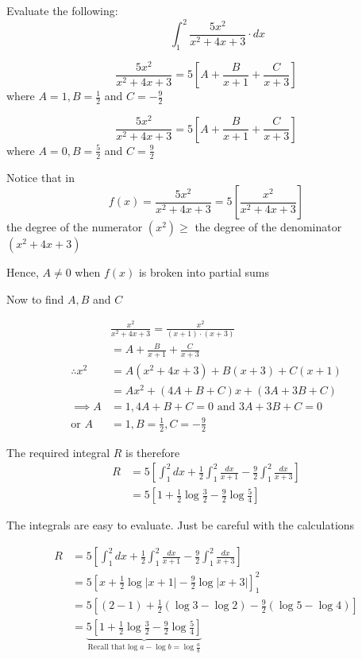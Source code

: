 \documentclass[14pt,fleqn]{extarticle}
\begin{document}
Evaluate the following: 
\[ \qquad \int_1^2\frac{5x^2}{x^2+4x+3}\cdot dx \]
%


\newcard 

\[ \frac{5x^2}{x^2 + 4x + 3} = 5 \left[A + \frac{B}{x+1} + \frac{C}{x+3} \right]\]
where $A = 1, B = \frac{1}{2}$ and $C = -\frac{9}{2}$ 

\newcard 

\[ \frac{5x^2}{x^2 + 4x + 3} = 5 \left[A + \frac{B}{x+1} + \frac{C}{x+3} \right]\]
where $A = 0, B = \frac{5}{2}$ and $C = \frac{9}{2}$

\newcard 

Notice that in  \[f(x) = \frac{5x^2}{x^2 + 4x + 3} = 5 \left[\frac{x^2}{x^2+4x+3} \right]\] the degree of the numerator $(x^2) \geq $ the degree of the denominator $(x^2+4x+3)$ \newline 

Hence, $A\neq 0$ when $f(x)$ is broken into partial sums\newline 

Now to find $A,B$ and $C$ 

\smallmath
\begin{align}
	&\frac{x^2}{x^2 + 4x+3} = \frac{x^2}{\left(x+1 \right)\cdot \left(x+3 \right)} \\
	& = A + \frac{B}{x+1} + \frac{C}{x+3}  \\
	\therefore x^2 &= A (x^2+4x+3) + B(x+3) + C(x+1) \\
	&= Ax^2 + \left(4A+B+C \right) x + \left(3A+3B+C \right) \\
	\implies A &= 1, 4A+B+C = 0\text{ and } 3A+3B+ C = 0 \\
	\text{or } A &= 1, B = \frac{1}{2}, C = -\frac{9}{2}
\end{align}

\newcard 

The required integral $R$ is therefore 
\begin{align}
	R &= 5 \left[ \int_1^2 dx + \frac{1}{2}\int_1^2 \frac{dx}{x+1} - \frac{9}{2}\int_1^2 \frac{dx}{x+3} \right] \\
	&= 5 \left[1+\frac{1}{2}\log\frac{3}{2} - \frac{9}{2}\log\frac{5}{4} \right]
\end{align}

\newcard 
\smallmath

The integrals are easy to evaluate. Just be careful with the calculations 

\begin{align}
	R &=  5 \left[ \int_1^2 dx + \frac{1}{2}\int_1^2 \frac{dx}{x+1} - \frac{9}{2}\int_1^2 \frac{dx}{x+3} \right] \\
	&= 5 \left[ x + \frac{1}{2}\log\vert x+1\vert -\frac{9}{2}\log \vert x+3\vert\right]_1^2 \\
	&= 5 \left[ \left(2-1 \right) + \frac{1}{2} \left(\log 3 - \log 2 \right)- \frac{9}{2} \left(\log 5 - \log 4 \right)\right] \\
	&= \underbrace{5 \left[1 + \frac{1}{2}\log \frac{3}{2} - \frac{9}{2}\log \frac{5}{4} \right]}_{\text{Recall that} \log a - \log b = \log\frac{a}{b}}
\end{align}
\end{document}
